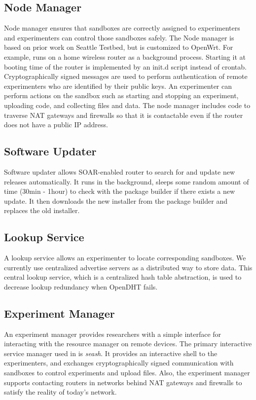 \subsection{Node Manager}
\label{sec.nodemanager}
Node manager\cite{nodemanager} ensures that sandboxes are correctly assigned to
experimenters and experimenters can control those sandboxes safely. The Node manager
is based on prior work on Seattle Testbed, but is customized to OpenWrt. For example,
 \sysname runs on a home wireless router as a background process. Starting it at
  booting time of the router is implemented by an init.d script instead of crontab.
  Cryptographically signed messages are used to perform authentication of remote
  experimenters who are identified by their public keys. An experimenter can
  perform actions on the sandbox such as starting and stopping an experiment,
  uploading code, and collecting files and data. The node manager includes code to traverse NAT gateways and firewalls so that it is contactable even if the router does not have a public IP address.

\subsection{Software Updater}
\label{sec.softwareupdater}
Software updater allows SOAR-enabled router to search for and update new releases
automatically. It runs in the background, sleeps some random amount of time (30min - 1hour)
 to check with the package builder if there exists a new update.  It then downloads
  the new installer from the package builder and replaces the old installer.

\subsection{Lookup Service}
\label{sec.lookupservice}
A lookup service allows an experimenter to locate corresponding sandboxes. We
currently use centralized advertise servers as a distributed way to store data.
This central lookup service, which is a centralized hash table abstraction, is used
 to decrease lookup redundancy when OpenDHT fails.

\subsection{Experiment Manager}
\label{sec.seash}
An experiment manager provides researchers with a simple interface for interacting
 with the resource manager on remote devices. The primary interactive service
 manager used in \sysname is \textit{seash}\cite{seash}. It provides an interactive
  shell to the experimenters, and exchanges cryptographically signed communication
   with sandboxes to control experiments and upload files. Also, the experiment manager
    supports contacting routers in networks behind NAT gateways and firewalls to satisfy the reality of today's network.

